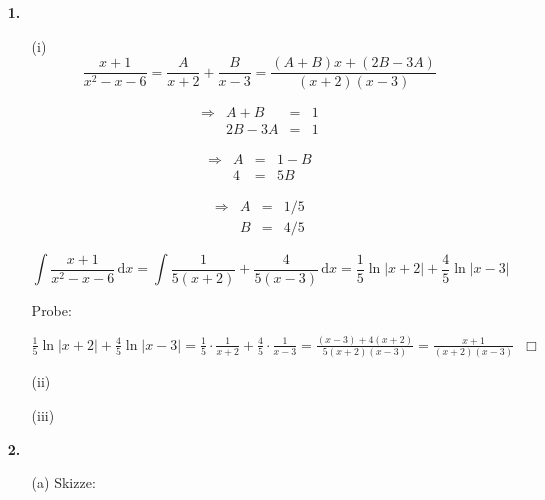\documentclass[a4paper,11pt,fleqn]{scrartcl}
\author{\authorinfo}
\title{\titleinfo}
\date{\today}
\newcommand{\dX}[1]{\, \mathrm{d}#1}
\newcommand{\dx}[0]{\dX{x}}
\begin{document}
\maketitle
\begin{enumerate}
    \item[\textbf{1.}]
        \begin{enumerate}
            \item[(i)]
                \[ \frac{x+1}{x^2-x-6} = \frac{A}{x+2} + \frac{B}{x-3} = \frac{(A+B)x + (2B - 3A)}{(x+2)(x-3)} \]
                \begin{multicols}{3}
                    \[\begin{array}{lrcl}
                        \Rightarrow & A + B &=& 1\\
                        & 2B - 3A &=& 1
                    \end{array}\]

                    \[\begin{array}{lrcl}
                        \Rightarrow & A &=& 1 - B\\
                        & 4 &=& 5B
                    \end{array}\]

                    \[\begin{array}{lrcl}
                        \Rightarrow & A &=& 1 / 5\\
                        & B &=& 4 / 5
                    \end{array}\]
                \end{multicols}

                \[ \int \frac{x+1}{x^2-x-6} \dx = \int \frac{1}{5(x+2)} + \frac{4}{5(x-3)} \dx = \frac{1}{5} \ln |x+2| + \frac{4}{5} \ln |x-3| \]

                Probe:

                \( \frac{1}{5} \ln |x+2| + \frac{4}{5} \ln |x-3| = \frac{1}{5} \cdot \frac{1}{x+2} + \frac{4}{5} \cdot \frac{1}{x-3} = \frac{(x-3)+4(x+2)}{5(x+2)(x-3)} = \frac{x + 1}{(x+2)(x-3)} \;\;\Box \)

            \item[(ii)]

            \item[(iii)]
        \end{enumerate}
    \item[\textbf{2.}]
        \begin{enumerate}
            \item[(a)]
                Skizze:


\end{enumerate}
\end{enumerate}
\end{document}
